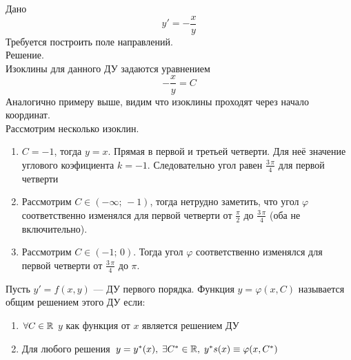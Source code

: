 \begin{Example}
    Дано
    \[
        y' = -\frac{x}{y}
    \]
    Требуется построить поле направлений.\\
    Решение.\\
    Изоклины для данного ДУ задаются уравнением 
    \[
        -\frac{x}{y} = C
    \]
    Аналогично примеру выше, видим что изоклины проходят через начало координат.\\
    Рассмотрим несколько изоклин.
    \begin{enumerate}
        \item $C = -1$, тогда $y = x$. Прямая в первой и третьей четверти. Для неё значение углового коэфициента $k = -1$. Следовательно угол равен $\frac{3\,\pi}{4}$ для первой четверти
        
        \item Рассмотрим $C \in (-\infty;\, -1)$, тогда нетрудно заметить, что угол $\varphi$ соответственно изменялся для первой четверти от $\frac{\pi}{2}$ до $\frac{3\,\pi}{4}$ (оба не включительно).
        
        \item Рассмотрим $C \in (-1;\, 0)$. Тогда угол $\varphi$ соответственно изменялся для первой четверти от $\frac{3\,\pi}{4}$ до $\pi$.
    \end{enumerate}
    \begin{figure}[h!]
        \noindent{}
    \end{figure}
\end{Example}

\begin{Def}
    Пусть $y' = f(x, y)$ --- ДУ первого порядка. Функция $y = \varphi(x, C)$ называется общим решением этого ДУ если:
    \begin{enumerate}
        \item $\forall C \in \mathbb{R}$ $y$ как функция от $x$ является решением ДУ
        
        \item Для любого решения $y = y^*(x), \; \exists C^* \in \mathbb{R}, \; y^*s(x) \equiv \varphi(x, C^*)$
    \end{enumerate}
\end{Def}

